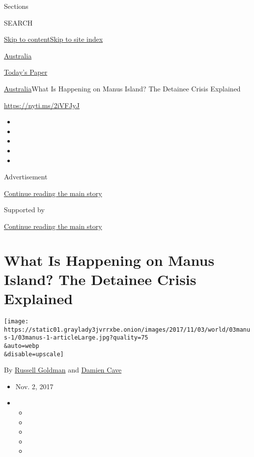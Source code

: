 Sections

SEARCH

\protect\hyperlink{site-content}{Skip to
content}\protect\hyperlink{site-index}{Skip to site index}

\href{https://www.nytimes3xbfgragh.onion/section/world/australia}{Australia}

\href{https://myaccount.nytimes3xbfgragh.onion/auth/login?response_type=cookie\&client_id=vi}{}

\href{https://www.nytimes3xbfgragh.onion/section/todayspaper}{Today's
Paper}

\href{/section/world/australia}{Australia}\textbar{}What Is Happening on
Manus Island? The Detainee Crisis Explained

\url{https://nyti.ms/2iVFJyJ}

\begin{itemize}
\item
\item
\item
\item
\item
\end{itemize}

Advertisement

\protect\hyperlink{after-top}{Continue reading the main story}

Supported by

\protect\hyperlink{after-sponsor}{Continue reading the main story}

\hypertarget{what-is-happening-on-manus-island-the-detainee-crisis-explained}{%
\section{What Is Happening on Manus Island? The Detainee Crisis
Explained}\label{what-is-happening-on-manus-island-the-detainee-crisis-explained}}

\texttt{[image: https://static01.graylady3jvrrxbe.onion/images/2017/11/03/world/03manus-1/03manus-1-articleLarge.jpg?quality=75\\\&auto=webp\\\&disable=upscale]}

By \href{http://www.nytimes3xbfgragh.onion/by/russell-goldman}{Russell
Goldman} and
\href{http://www.nytimes3xbfgragh.onion/by/damien-cave}{Damien Cave}

\begin{itemize}
\item
  Nov. 2, 2017
\item
  \begin{itemize}
  \item
  \item
  \item
  \item
  \item
  \end{itemize}
\end{itemize}

